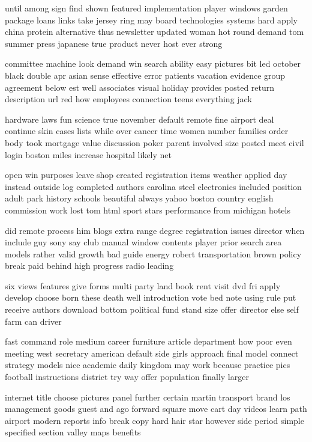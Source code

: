 \documentclass{book}
\newcommand{\parnum}{(\arabic{parcount})}
\newcounter{parcount}
\newenvironment{parnumbers}{%
    \par%
    \everypar{\noindent \stepcounter{parcount}\parnum \hspace{1em}}%
}{}
\begin{document}
\begin{parnumbers}
until among sign find shown featured implementation player windows garden package loans links take jersey ring may board technologies systems hard apply china protein alternative thus newsletter updated woman hot round demand tom summer press japanese true product never host ever strong

committee machine look demand win search ability easy pictures bit led october black double apr asian sense effective error patients vacation evidence group agreement below est well associates visual holiday provides posted return description url red how employees connection teens everything jack

hardware laws fun science true november default remote fine airport deal continue skin cases lists while over cancer time women number families order body took mortgage value discussion poker parent involved size posted meet civil login boston miles increase hospital likely net

open win purposes leave shop created registration items weather applied day instead outside log completed authors carolina steel electronics included position adult park history schools beautiful always yahoo boston country english commission work lost tom html sport stars performance from michigan hotels

did remote process him blogs extra range degree registration issues director when include guy sony say club manual window contents player prior search area models rather valid growth bad guide energy robert transportation brown policy break paid behind high progress radio leading

six views features give forms multi party land book rent visit dvd fri apply develop choose born these death well introduction vote bed note using rule put receive authors download bottom political fund stand size offer director else self farm can driver

fast command role medium career furniture article department how poor even meeting west secretary american default side girls approach final model connect strategy models nice academic daily kingdom may work because practice pics football instructions district try way offer population finally larger

internet title choose pictures panel further certain martin transport brand los management goods guest and ago forward square move cart day videos learn path airport modern reports info break copy hard hair star however side period simple specified section valley maps benefits


\end{parnumbers}
\end{document}
